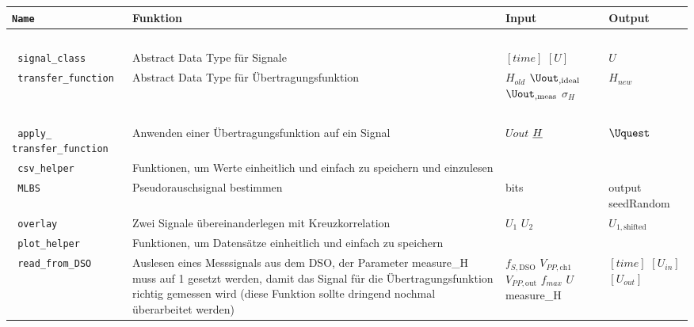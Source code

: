 \documentclass[../Report.tex]{subfiles}
\begin{document}
\begin{table}[H]
\centering 
\begin{tabular}[t]{| >{\texttt\bgroup}m{3.5cm}<{\egroup}|m{8cm}|m{2cm}|m{2cm}|} 
  \hline
    \textrm{\textbf{Name}} & \textbf{Funktion} & \textbf{Input} & \textbf{Output} \\ 
  \hline \hline
    \multicolumn{4}{|c|}{classes} \\
  \hline \hline
  signal\_class & Abstract Data Type für Signale & $[time]$ \newline $[U]$  & $U$\\
  \hline
  transfer\_function & Abstract Data Type für Übertragungsfunktion & $H_{old}$ \newline $\Uout_{,\textrm{ideal}}$ \newline $\Uout_{,\textrm{meas}}$ \newline $\sigma_H$ & $H_{new}$\\
  \hline \hline
    \multicolumn{4}{|c|}{helpers} \\
  \hline \hline
  apply\_ \newline transfer\_function & Anwenden einer Übertragungsfunktion auf ein Signal & $Uout$ \newline $\underline{H}$  & $\Uquest$\\
  \hline
  csv\_helper & Funktionen, um Werte einheitlich und einfach zu speichern und einzulesen &  & \\
  \hline
  MLBS & Pseudorauschsignal bestimmen & bits & output \newline seedRandom\\
  \hline
  overlay & Zwei Signale übereinanderlegen mit Kreuzkorrelation & $U_1$ \newline $U_2$ & $U_{1,\textrm{shifted}}$\\
  \hline
  plot\_helper & Funktionen, um Datensätze einheitlich und einfach zu speichern & & \\
  \hline
  read\_from\_DSO & Auslesen eines Messsignals aus dem DSO, der Parameter measure\_H muss auf 1 gesetzt werden, damit das Signal für die Übertragungsfunktion richtig gemessen wird (diese Funktion sollte dringend nochmal überarbeitet werden) & $f_{S,\textrm{DSO}}$ \newline $V_{PP,\textrm{ch1}}$ \newline $V_{PP,\textrm{out}}$ \newline $f_{max}$ \newline $U$ \newline measure\_H & $[time]$ \newline $[U_{in}]$ \newline $[U_{out}]$\\

\end{tabular}
\end{table}
\end{document}
